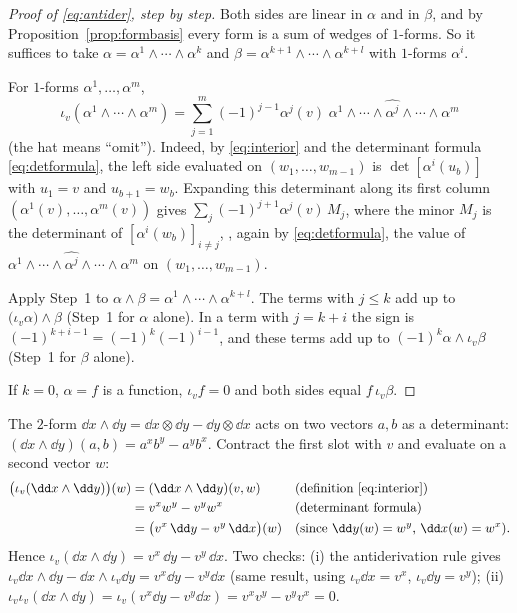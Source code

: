 \begin{proof}[Proof of \eqref{eq:antider}, step by step]
Both sides are linear in $\alpha$ and in $\beta$, and by Proposition~\ref{prop:formbasis} every form is a sum of wedges of $1$-forms.
So it suffices to take $\alpha=\alpha^1\wedge\cdots\wedge\alpha^k$ and $\beta=\alpha^{k+1}\wedge\cdots\wedge\alpha^{k+l}$ with $1$-forms $\alpha^i$.

 For $1$-forms $\alpha^1,\dots,\alpha^m$,
\[
\iota_v(\alpha^1\wedge\cdots\wedge\alpha^m)=\sum_{j=1}^m(-1)^{j-1}\alpha^j(v)\;\alpha^1\wedge\cdots\wedge\widehat{\alpha^j}\wedge\cdots\wedge\alpha^m
\]
(the hat means ``omit''). Indeed, by \eqref{eq:interior} and the determinant formula \eqref{eq:detformula}, the left side evaluated on
$(w_1,\dots,w_{m-1})$ is $\det[\alpha^i(u_b)]$ with $u_1=v$ and $u_{b+1}=w_b$. Expanding this determinant along its first column
$(\alpha^1(v),\dots,\alpha^m(v))$ gives $\sum_j(-1)^{j+1}\alpha^j(v)\,M_j$, where the minor $M_j$ is the determinant of $[\alpha^i(w_b)]_{i\neq j}$,
\ie, again by \eqref{eq:detformula}, the value of $\alpha^1\wedge\cdots\wedge\widehat{\alpha^j}\wedge\cdots\wedge\alpha^m$ on $(w_1,\dots,w_{m-1})$.

 Apply Step~1 to $\alpha\wedge\beta=\alpha^1\wedge\cdots\wedge\alpha^{k+l}$. The terms with $j\le k$ add up to
$\bigl(\iota_v\alpha\bigr)\wedge\beta$ (Step~1 for $\alpha$ alone). In a term with $j=k+i$ the sign is
$(-1)^{k+i-1}=(-1)^k(-1)^{i-1}$, and these terms add up to $(-1)^k\alpha\wedge\iota_v\beta$ (Step~1 for $\beta$ alone).

 If $k=0$, $\alpha=f$ is a function, $\iota_vf=0$ and both sides equal $f\,\iota_v\beta$.
\end{proof}

\begin{example}\label{ex:interiorplane}
The $2$-form $\dd x\wedge\dd y=\dd x\otimes\dd y-\dd y\otimes\dd x$ acts on two vectors $a,b$ as a determinant:
$(\dd x\wedge\dd y)(a,b)=a^xb^y-a^yb^x$. Contract the first slot with $v$ and evaluate on a second vector $w$:
\begin{align*}
\bigl(\iota_v(\dd x\wedge\dd y)\bigr)(w)&=(\dd x\wedge\dd y)(v,w) &&\text{(definition \eqref{eq:interior})}\\
&=v^xw^y-v^yw^x &&\text{(determinant formula)}\\
&=\bigl(v^x\,\dd y-v^y\,\dd x\bigr)(w) &&\text{(since $\dd y(w)=w^y$, $\dd x(w)=w^x$).}
\end{align*}
Hence $\iota_v(\dd x\wedge\dd y)=v^x\,\dd y-v^y\,\dd x$. Two checks: (i) the antiderivation rule gives $\iota_v\dd x\wedge\dd y-\dd x\wedge\iota_v\dd y=v^x\dd y-v^y\dd x$ (same result, using $\iota_v\dd x=v^x$, $\iota_v\dd y=v^y$);
(ii) $\iota_v\iota_v(\dd x\wedge\dd y)=\iota_v(v^x\dd y-v^y\dd x)=v^xv^y-v^yv^x=0$.
\end{example}

